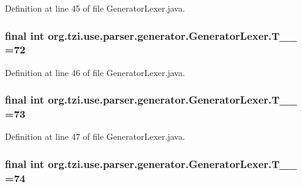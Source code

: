 Definition at line 45 of file Generator\-Lexer.\-java.

\hypertarget{classorg_1_1tzi_1_1use_1_1parser_1_1generator_1_1_generator_lexer_a51020f7b194b3ce8a1a8af041a3a23ab}{
\subsubsection[{T\-\_\-\-\_\-72}]{\setlength{\rightskip}{0pt plus 5cm}final int org.\-tzi.\-use.\-parser.\-generator.\-Generator\-Lexer.\-T\-\_\-\-\_ =72\hspace{0.3cm}{\ttfamily [static]}}}\label{classorg_1_1tzi_1_1use_1_1parser_1_1generator_1_1_generator_lexer_a51020f7b194b3ce8a1a8af041a3a23ab}


Definition at line 46 of file Generator\-Lexer.\-java.

\hypertarget{classorg_1_1tzi_1_1use_1_1parser_1_1generator_1_1_generator_lexer_a3ff83fed93767384e7afe939267ece6c}{
\subsubsection[{T\-\_\-\-\_\-73}]{\setlength{\rightskip}{0pt plus 5cm}final int org.\-tzi.\-use.\-parser.\-generator.\-Generator\-Lexer.\-T\-\_\-\-\_ =73\hspace{0.3cm}{\ttfamily [static]}}}\label{classorg_1_1tzi_1_1use_1_1parser_1_1generator_1_1_generator_lexer_a3ff83fed93767384e7afe939267ece6c}


Definition at line 47 of file Generator\-Lexer.\-java.

\hypertarget{classorg_1_1tzi_1_1use_1_1parser_1_1generator_1_1_generator_lexer_aaa900c5346c661e75dab11c6f7356c24}{
\subsubsection[{T\-\_\-\-\_\-74}]{\setlength{\rightskip}{0pt plus 5cm}final int org.\-tzi.\-use.\-parser.\-generator.\-Generator\-Lexer.\-T\-\_\-\-\_ =74\hspace{0.3cm}{\ttfamily [static]}}}\label{classorg_1_1tzi_1_1use_1_1parser_1_1generator_1_1_generator_lexer_aaa900c5346c661e75dab11c6f7356c24}


